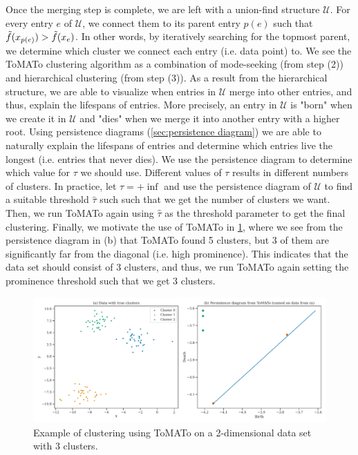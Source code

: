Once the merging step is complete, we are left with a union-find structure $\mathcal{U}$. For every entry $e$ of $\mathcal{U}$, we connect them to its parent entry $p(e)$ such that $\Tilde{f}(x_{p(e)}) > \Tilde{f}(x_e)$. In other words, by iteratively searching for the topmost parent, we determine which cluster we connect each entry (i.e. data point) to. We see the ToMATo clustering algorithm as a combination of mode-seeking (from step (2)) and hierarchical clustering (from step (3)). As a result from the hierarchical structure, we are able to visualize when entries in $\mathcal{U}$ merge into other entries, and thus, explain the lifespans of entries. More precisely, an entry in $\mathcal{U}$ is "born" when we create it in $\mathcal{U}$ and "dies" when we merge it into another entry with a higher root. Using persistence diagrams (\cref{sec:persistence diagram}) we are able to naturally explain the lifespans of entries and determine which entries live the longest (i.e. entries that never dies). We use the persistence diagram to determine which value for $\tau$ we should use. Different values of $\tau$ results in different numbers of clusters. In practice, let $\tau = +\inf$ and use the persistence diagram of $\mathcal{U}$ to find a suitable threshold $\hat{\tau}$ such such that we get the number of clusters we want. Then, we run ToMATo again using $\hat{\tau}$ as the threshold parameter to get the final clustering. Finally, we motivate the use of ToMATo in \cref{fig:k-tomato-clustering-2d-example}, where we see from the persistence diagram in (b) that ToMATo found 5 clusters, but 3 of them are significantly far from the diagonal (i.e. high prominence). This indicates that the data set should consist of 3 clusters, and thus, we run ToMATo again setting the prominence threshold such that we get 3 clusters.
\begin{figure}[H]
    \centering
    \includegraphics[width=\textwidth]{thesis/figures/k-tomato-clustering-2d-example.pdf}
    \caption{Example of clustering using ToMATo on a 2-dimensional data set with 3 clusters.}
    \label{fig:k-tomato-clustering-2d-example}
\end{figure}

